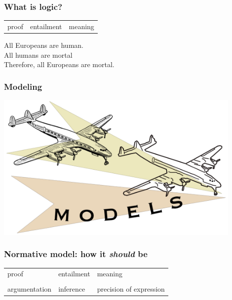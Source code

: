 \documentclass[fleqn,10pt,serif,xcolor=svgnames,xcolor=table,aspectratio=169,handout]{beamer}
\begin{document}
\begin{frame}
  \frametitle{What is logic?}

  \begin{center}
    \begin{Large}
      \begin{tabular}{C{2cm}C{4cm}C{2cm}}
        proof & entailment & meaning
      \end{tabular}
    \end{Large}
  \end{center}

  \pause
  \bigskip

  \begin{center}
    All Europeans are human.\\
    All humans are mortal\\
    Therefore, all Europeans are mortal.
  \end{center}
\end{frame}

\begin{frame}
  \frametitle{Modeling}

  \includegraphics[width=0.9\textwidth]{00-introduction-pics/model-planes.png}

\end{frame}

\begin{frame}
  \frametitle{Normative model: how it \textit{should} be}

 \begin{center}
    \begin{Large}
      \begin{tabular}{C{4cm}C{4cm}C{4cm}}
        proof & entailment & meaning \\
        & \\
        argumentation & inference & precision of expression
      \end{tabular}
    \end{Large}
  \end{center}

\end{frame}
\end{document}
